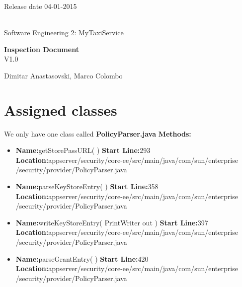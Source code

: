 \documentclass[12pt, oneside]{book}   	%
\begin{document}
\thispagestyle{empty}
\hspace{10cm}
Release date 04-01-2015
\\
\\
\begin{center}
{\huge Software Engineering 2:}
{\huge MyTaxiService}
\end{center}
\vspace*{\fill}
\begin{center}
\textbf{\huge Inspection Document} 
\\
\large{V1.0}
\end{center}
\vfill
\begin{center}
{\large Dimitar Anastasovski, Marco Colombo}
\end{center}
\clearpage
\pagestyle{plain}
\tableofcontents
\setcounter{page}{1}
\clearpage
\chapter{Assigned classes}
We only have one class called \textbf{PolicyParser.java}
\newline
\newline
\textbf{\Large{Methods:}}
\newline
\begin{itemize}
\item{\textbf{Name:}getStorePassURL( )
\newline
\textbf{Start Line:}293
\newline
\textbf{Location:}appserver/security/core-ee/src/main/java/com/sun/enterprise
\newline
/security/provider/PolicyParser.java}
\newline
\item{\textbf{Name:}parseKeyStoreEntry( )
\newline
\textbf{Start Line:}358
\newline
\textbf{Location:}appserver/security/core-ee/src/main/java/com/sun/enterprise
\newline
/security/provider/PolicyParser.java}
\newline
\item{\textbf{Name:}writeKeyStoreEntry( PrintWriter out )
\newline
\textbf{Start Line:}397
\newline
\textbf{Location:}appserver/security/core-ee/src/main/java/com/sun/enterprise
\newline
/security/provider/PolicyParser.java}
\newline
\item{\textbf{Name:}parseGrantEntry( )
\newline
\textbf{Start Line:}420
\newline
\textbf{Location:}appserver/security/core-ee/src/main/java/com/sun/enterprise
\newline
/security/provider/PolicyParser.java}
\end{itemize}
\end{document}
